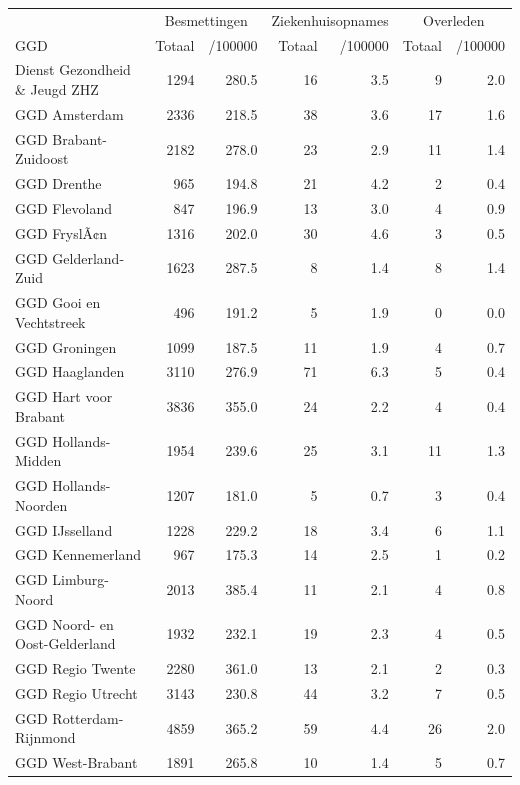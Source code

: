 \documentclass[
  english,
  man,floatsintext]{apa6}
\begin{document}
\begin{table}
\centering\begingroup\fontsize{10}{12}\selectfont

\begin{threeparttable}
\begin{tabular}{lrrrrrr}
\toprule
\multicolumn{1}{c}{ } & \multicolumn{2}{c}{Besmettingen} & \multicolumn{2}{c}{Ziekenhuisopnames} & \multicolumn{2}{c}{Overleden} \\
\cmidrule(l{3pt}r{3pt}){2-3} \cmidrule(l{3pt}r{3pt}){4-5} \cmidrule(l{3pt}r{3pt}){6-7}
GGD & Totaal & /100000 & Totaal & /100000 & Totaal & /100000\\
\midrule
Dienst Gezondheid \& Jeugd ZHZ & 1294 & 280.5 & 16 & 3.5 & 9 & 2.0\\
GGD Amsterdam & 2336 & 218.5 & 38 & 3.6 & 17 & 1.6\\
GGD Brabant-Zuidoost & 2182 & 278.0 & 23 & 2.9 & 11 & 1.4\\
GGD Drenthe & 965 & 194.8 & 21 & 4.2 & 2 & 0.4\\
GGD Flevoland & 847 & 196.9 & 13 & 3.0 & 4 & 0.9\\
GGD FryslÃ¢n & 1316 & 202.0 & 30 & 4.6 & 3 & 0.5\\
GGD Gelderland-Zuid & 1623 & 287.5 & 8 & 1.4 & 8 & 1.4\\
GGD Gooi en Vechtstreek & 496 & 191.2 & 5 & 1.9 & 0 & 0.0\\
GGD Groningen & 1099 & 187.5 & 11 & 1.9 & 4 & 0.7\\
GGD Haaglanden & 3110 & 276.9 & 71 & 6.3 & 5 & 0.4\\
GGD Hart voor Brabant & 3836 & 355.0 & 24 & 2.2 & 4 & 0.4\\
GGD Hollands-Midden & 1954 & 239.6 & 25 & 3.1 & 11 & 1.3\\
GGD Hollands-Noorden & 1207 & 181.0 & 5 & 0.7 & 3 & 0.4\\
GGD IJsselland & 1228 & 229.2 & 18 & 3.4 & 6 & 1.1\\
GGD Kennemerland & 967 & 175.3 & 14 & 2.5 & 1 & 0.2\\
GGD Limburg-Noord & 2013 & 385.4 & 11 & 2.1 & 4 & 0.8\\
GGD Noord- en Oost-Gelderland & 1932 & 232.1 & 19 & 2.3 & 4 & 0.5\\
GGD Regio Twente & 2280 & 361.0 & 13 & 2.1 & 2 & 0.3\\
GGD Regio Utrecht & 3143 & 230.8 & 44 & 3.2 & 7 & 0.5\\
GGD Rotterdam-Rijnmond & 4859 & 365.2 & 59 & 4.4 & 26 & 2.0\\
GGD West-Brabant & 1891 & 265.8 & 10 & 1.4 & 5 & 0.7\\

\end{tabular}
\end{threeparttable}
\end{table}
\end{document}
